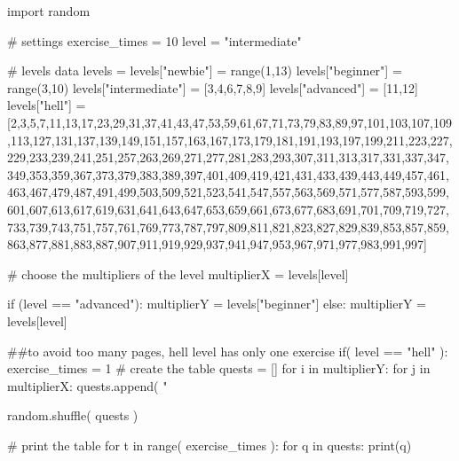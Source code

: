 \documentclass{article}
\begin{document}
\begin{multicols}{6}

\large
{}
\noindent 
\begin{pycode}
import random

# settings 
exercise_times = 10
level = "intermediate"

# levels data
levels = {}
levels["newbie"]   = range(1,13)
levels["beginner"] = range(3,10)
levels["intermediate"] = [3,4,6,7,8,9]
levels["advanced"]     = [11,12]
levels["hell"] = [2,3,5,7,11,13,17,23,29,31,37,41,43,47,53,59,61,67,71,73,79,83,89,97,101,103,107,109,113,127,131,137,139,149,151,157,163,167,173,179,181,191,193,197,199,211,223,227,229,233,239,241,251,257,263,269,271,277,281,283,293,307,311,313,317,331,337,347,349,353,359,367,373,379,383,389,397,401,409,419,421,431,433,439,443,449,457,461,463,467,479,487,491,499,503,509,521,523,541,547,557,563,569,571,577,587,593,599,601,607,613,617,619,631,641,643,647,653,659,661,673,677,683,691,701,709,719,727,733,739,743,751,757,761,769,773,787,797,809,811,821,823,827,829,839,853,857,859,863,877,881,883,887,907,911,919,929,937,941,947,953,967,971,977,983,991,997]

# choose the multipliers of the level
multiplierX = levels[level]

if (level == "advanced"):
    multiplierY = levels["beginner"]
else:
    multiplierY = levels[level]

##to avoid too many pages, hell level has only one exercise
if( level == "hell" ):
    exercise_times = 1  
# create the table
quests = []
for i in multiplierY:
    for j in multiplierX:
        quests.append( "%

random.shuffle( quests )

# print the table
for t in range( exercise_times ):
    for q in quests:
        print(q)

\end{pycode}
\end{multicols}
\end{document}
